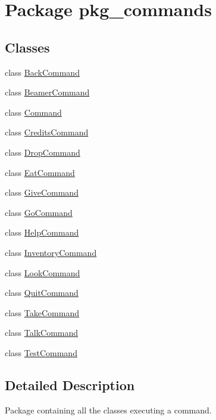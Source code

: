 \hypertarget{namespacepkg__commands}{\section{Package pkg\-\_\-commands}
\label{namespacepkg__commands}
}
\subsection*{Classes}
\begin{DoxyCompactItemize}
\item 
class \hyperlink{classpkg__commands_1_1BackCommand}{Back\-Command}
\item 
class \hyperlink{classpkg__commands_1_1BeamerCommand}{Beamer\-Command}
\item 
class \hyperlink{classpkg__commands_1_1Command}{Command}
\item 
class \hyperlink{classpkg__commands_1_1CreditsCommand}{Credits\-Command}
\item 
class \hyperlink{classpkg__commands_1_1DropCommand}{Drop\-Command}
\item 
class \hyperlink{classpkg__commands_1_1EatCommand}{Eat\-Command}
\item 
class \hyperlink{classpkg__commands_1_1GiveCommand}{Give\-Command}
\item 
class \hyperlink{classpkg__commands_1_1GoCommand}{Go\-Command}
\item 
class \hyperlink{classpkg__commands_1_1HelpCommand}{Help\-Command}
\item 
class \hyperlink{classpkg__commands_1_1InventoryCommand}{Inventory\-Command}
\item 
class \hyperlink{classpkg__commands_1_1LookCommand}{Look\-Command}
\item 
class \hyperlink{classpkg__commands_1_1QuitCommand}{Quit\-Command}
\item 
class \hyperlink{classpkg__commands_1_1TakeCommand}{Take\-Command}
\item 
class \hyperlink{classpkg__commands_1_1TalkCommand}{Talk\-Command}
\item 
class \hyperlink{classpkg__commands_1_1TestCommand}{Test\-Command}
\end{DoxyCompactItemize}


\subsection{Detailed Description}
Package containing all the classes executing a command. 
